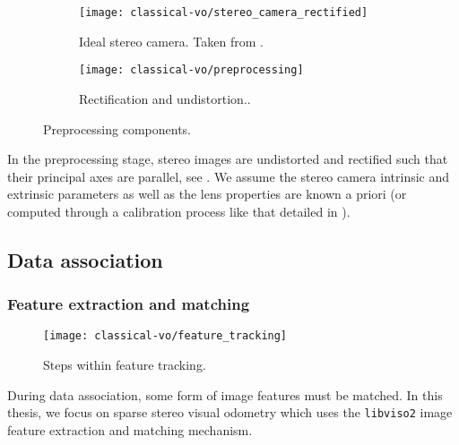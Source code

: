 \begin{figure}[h!]
     \centering
     \begin{subfigure}[b]{0.48\textwidth}
         \centering
     		\texttt{[image: classical-vo/stereo\_camera\_rectified]}
			\caption{Ideal stereo camera. Taken from \cite{furgale_phd11}.}
			 \label{fig:vo_stereo_camera}
     \end{subfigure}
     \hfill
     \begin{subfigure}[b]{0.48\textwidth}
         \centering
         \texttt{[image: classical-vo/preprocessing]}
        \caption{Rectification and undistortion..}
         \label{fig:vo_undistort_recitfy}
	 \end{subfigure}
    \caption{Preprocessing components. }
        \label{fig:vo_preprocessing}
\end{figure}

In the preprocessing stage, stereo images are undistorted and rectified such that their principal axes are parallel, see . We assume the stereo camera intrinsic and extrinsic parameters as well as the lens properties are known a priori (or computed through a calibration process like that detailed in \cite{kelly_phd2011}).

\subsection{Data association}

\subsubsection{Feature extraction and matching}

\begin{figure}[h!]
\begin{center}
		\texttt{[image: classical-vo/feature\_tracking]}
		\caption{Steps within feature tracking.}
  	\label{fig:vo_feature_tracking}
\end{center}
\end{figure}

During data association, some form of image features must be matched. In this thesis, we focus on sparse stereo visual odometry which uses the \texttt{libviso2} \citep{geiger2011stereoscan} image feature extraction and matching mechanism.  

